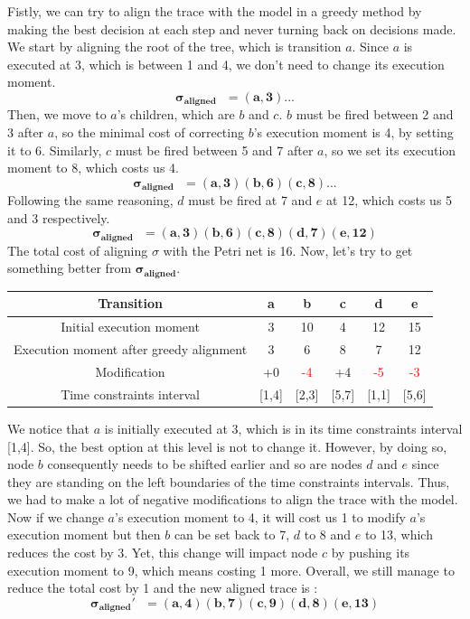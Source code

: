 \documentclass{article}
\begin{document}
Fistly, we can try to align the trace with the model in a greedy method by making the best decision
at each step and never turning back on decisions made. We start by aligning the root of the tree,
which is transition $a$. Since $a$ is executed at 3, which is between 1 and 4, we don't need to 
change its execution moment. 
\[\boldsymbol{\sigma_{aligned}} \text{ }\mathbf{= (a,3)...}\]
Then, we move to $a$'s children, which are $b$ and $c$.
$b$ must be fired between 2 and 3 after $a$, so the minimal cost of correcting $b$'s execution moment is 4,
by setting it to 6. Similarly, $c$ must be fired between 5 and 7 after $a$, so we set its execution moment to 8, 
which costs us 4. 
\[\boldsymbol{\sigma_{aligned}} \text{ }\mathbf{= (a,3)(b,6)(c,8)...}\]
Following the same reasoning, $d$ must be fired at 7 and $e$ at 12, which costs us 5 and 3 respectively.
\[\boldsymbol{\sigma_{aligned}} \text{ }\mathbf{= (a,3)(b,6)(c,8)(d,7)(e,12)}\]
The total cost of aligning $\sigma$ with the Petri net is 16. Now, let's try to get something 
better from $\boldsymbol{\sigma_{aligned}}$. 

\begin{tabular}{|c|c|c|c|c|c|}
    \hline
    Transition & a & b & c & d & e \\
    \hline
    Initial execution moment & 3 & 10 & 4 & 12 & 15 \\
    \hline
    Execution moment after greedy alignment & 3 & 6 & 8 & 7 & 12 \\
    \hline
    Modification & +0 & \textcolor{red}{-4} & +4 & \textcolor{red}{-5} & \textcolor{red}{-3} \\
    \hline
    Time constraints interval & [1,4] & [2,3] & [5,7] & [1,1] & [5,6] \\
    \hline
\end{tabular}

\vspace{0.3cm}
We notice that $a$ is initially executed at 3, which is in its time constraints interval [1,4]. So,
the best option at this level is not to change it. However, by doing so, node $b$ consequently needs to be shifted 
earlier and so are nodes $d$ and $e$ since they are standing on the left 
boundaries of the time constraints intervals. Thus, we had to make a lot of negative modifications
to align the trace with the model. Now if we change $a$'s execution moment to 4, it will cost us 1 
to modify  $a$'s execution moment but then $b$ can be set back to 7, $d$ to 8 and $e$ to 13, which reduces 
the cost by 3. Yet, this change will impact node $c$ by pushing its execution moment to 9, which means 
costing 1 more. Overall, we still manage to reduce the total cost by 1 and the new aligned trace is :
\[\boldsymbol{\sigma_{aligned}'} \text{ }\mathbf{= (a,4)(b,7)(c,9)(d,8)(e,13)}\]
\end{document}
